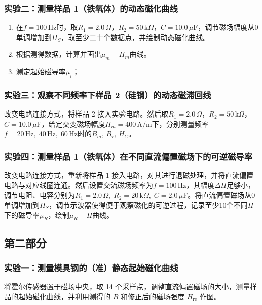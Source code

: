 \documentclass[UTF8]{article}
\theoremstyle{MyLineTheoremStyle} %
\theoremstyle{MyBlockTheoremStyle} %
\theoremstyle{MySubsubsectionStyle} %
\begin{document}
\subsubsection{实验二：测量样品 1（铁氧体）的动态磁化曲线}

\begin{enumerate}
\item 在$ f=100\,\mathrm{Hz} $时，取$ R_1=2.0\,\Omega $，$ R_2=50\,\mathrm k\Omega $，$ C=10.0\,\mu\mathrm F $，调节磁场幅度从$ 0 $单调增加到$ H_S $，取至少二十个数据点，并绘制动态磁化曲线。
\item 根据测得数据，计算并画出$ \mu_m-H_m $曲线。
\item 测定起始磁导率$ \mu_i $；
\end{enumerate}


\subsubsection{实验三：观察不同频率下样品 2（硅钢）的动态磁滞回线}

改变电路连接方式，将样品 2 接入实验电路。然后取$ R_1=2.0\,\Omega $，$ R_2=50\,\mathrm k\Omega $，$ C=10.0\,\mu\mathrm F $，给定交变磁场幅度$ H_m=400\,\mathrm{A/m} $下，分别测量频率$ f=20\,\mathrm{Hz},\;40\,\mathrm{Hz},\;60\,\mathrm{Hz} $时的$ B_m,\,B_r,\,H_C $。

\subsubsection{实验四：测量样品 1（铁氧体）在不同直流偏置磁场下的可逆磁导率}
改变电路连接方式，重新将样品 1 接入电路，对其进行退磁处理，并将直流偏置电路与对应线圈连通。然后设置交流磁场频率为$ f=100\,\mathrm{Hz} $，其幅度$ \Delta H $足够小，调节电阻、电容分别为$ R_1=2.0\,\Omega,\;R_2=20\,\mathrm k\Omega,\;C=2.0\,\mu\mathrm F $。将直流偏置磁场从0单调增加到$ H_S $，调节示波器使得便于观察磁化的可逆过程，记录至少10个不同$ H $下的磁导率$ \mu_R $，绘制$ \mu_R-H $曲线。


\subsection{第二部分}

\subsubsection{实验一：测量模具钢的（准）静态起始磁化曲线}

将霍尔传感器置于磁场中央，取 14 个采样点，调整直流偏置磁场的大小，测量样品的起始磁化曲线，并利用测得的 $B$ 和修正后的磁场强度 $H_{\text{re}}$ 作图。
\end{document}
